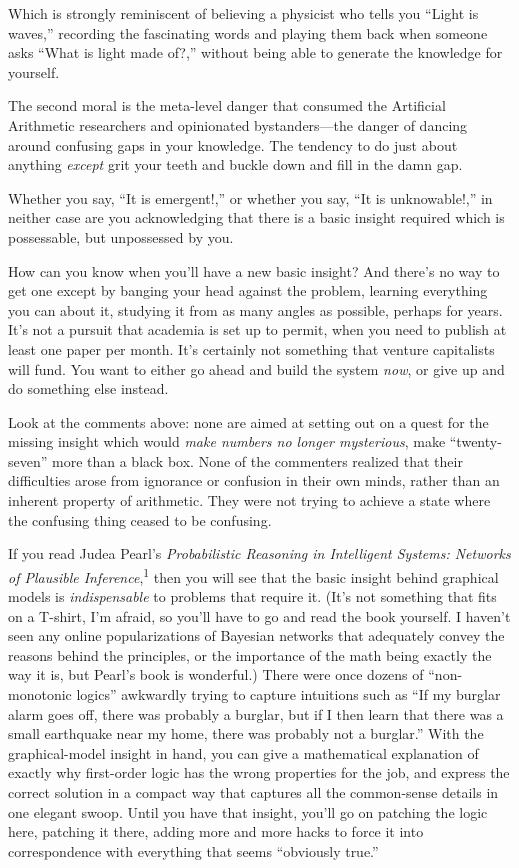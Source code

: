 {
 Which is strongly reminiscent of believing a physicist who tells
you ``Light is waves,'' recording
the fascinating words and playing them back when someone asks
``What is light made of?,'' without
being able to generate the knowledge for yourself.}

{
 The second moral is the meta-level danger that consumed the
Artificial Arithmetic researchers and opinionated bystanders---the
danger of dancing around confusing gaps in your knowledge. The tendency
to do just about anything \textit{except} grit your teeth and buckle
down and fill in the damn gap.}

{
 Whether you say, ``It is
emergent!,'' or whether you say,
``It is unknowable!,'' in neither
case are you acknowledging that there is a basic insight required which
is possessable, but unpossessed by you.}

{
 How can you know when you'll have a new basic
insight? And there's no way to get one except by
banging your head against the problem, learning everything you can
about it, studying it from as many angles as possible, perhaps for
years. It's not a pursuit that academia is set up to
permit, when you need to publish at least one paper per month.
It's certainly not something that venture capitalists
will fund. You want to either go ahead and build the system
\textit{now}, or give up and do something else instead.}

{
 Look at the comments above: none are aimed at setting out on a
quest for the missing insight which would \textit{make numbers no
longer mysterious}, make
``twenty-seven'' more than a black
box. None of the commenters realized that their difficulties arose from
ignorance or confusion in their own minds, rather than an inherent
property of arithmetic. They were not trying to achieve a state where
the confusing thing ceased to be confusing.}

{
 If you read Judea Pearl's \textit{Probabilistic
Reasoning in Intelligent Systems: Networks of Plausible
Inference},\textsuperscript{1} then you will see that the basic insight
behind graphical models is \textit{indispensable} to problems that
require it. (It's not something that fits on a T-shirt,
I'm afraid, so you'll have to go and
read the book yourself. I haven't seen any online
popularizations of Bayesian networks that adequately convey the reasons
behind the principles, or the importance of the math being exactly the
way it is, but Pearl's book is wonderful.) There were
once dozens of ``non-monotonic
logics'' awkwardly trying to capture intuitions such
as ``If my burglar alarm goes off, there was probably
a burglar, but if I then learn that there was a small earthquake near
my home, there was probably not a burglar.'' With the
graphical-model insight in hand, you can give a mathematical
explanation of exactly why first-order logic has the wrong properties
for the job, and express the correct solution in a compact way that
captures all the common-sense details in one elegant swoop. Until you
have that insight, you'll go on patching the logic
here, patching it there, adding more and more hacks to force it into
correspondence with everything that seems ``obviously
true.''}

